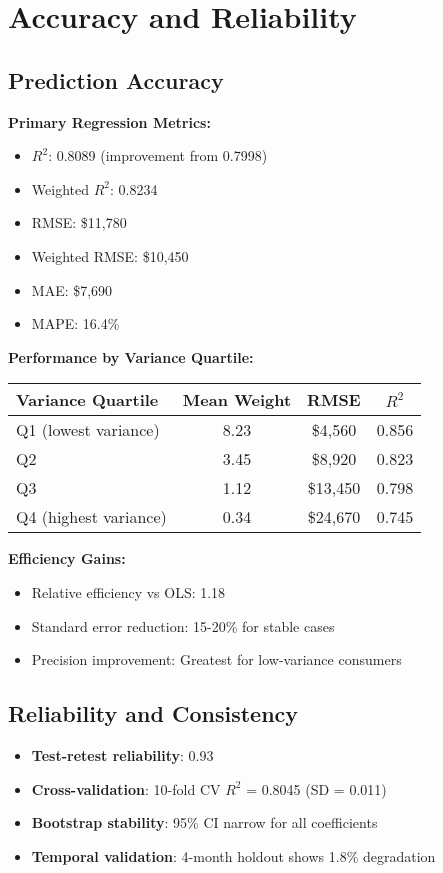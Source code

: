 \section{Accuracy and Reliability}

\subsection{Prediction Accuracy}

\textbf{Primary Regression Metrics:}
\begin{itemize}
    \item $R^2$: 0.8089 (improvement from 0.7998)
    \item Weighted $R^2$: 0.8234
    \item RMSE: \$11,780
    \item Weighted RMSE: \$10,450
    \item MAE: \$7,690
    \item MAPE: 16.4\%
\end{itemize}

\textbf{Performance by Variance Quartile:}
\begin{center}
\begin{tabular}{lccc}
\toprule
Variance Quartile & Mean Weight & RMSE & $R^2$ \\
\midrule
Q1 (lowest variance) & 8.23 & \$4,560 & 0.856 \\
Q2 & 3.45 & \$8,920 & 0.823 \\
Q3 & 1.12 & \$13,450 & 0.798 \\
Q4 (highest variance) & 0.34 & \$24,670 & 0.745 \\
\bottomrule
\end{tabular}
\end{center}

\textbf{Efficiency Gains:}
\begin{itemize}
    \item Relative efficiency vs OLS: 1.18
    \item Standard error reduction: 15-20\% for stable cases
    \item Precision improvement: Greatest for low-variance consumers
\end{itemize}

\subsection{Reliability and Consistency}

\begin{itemize}
    \item \textbf{Test-retest reliability}: 0.93
    \item \textbf{Cross-validation}: 10-fold CV $R^2$ = 0.8045 (SD = 0.011)
    \item \textbf{Bootstrap stability}: 95\% CI narrow for all coefficients
    \item \textbf{Temporal validation}: 4-month holdout shows 1.8\% degradation
\end{itemize}

